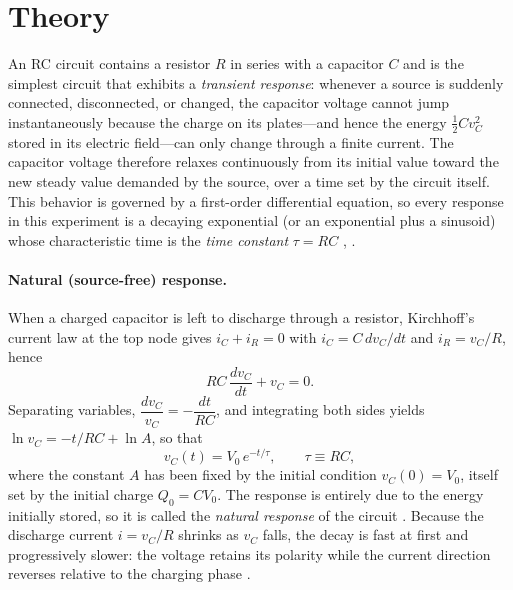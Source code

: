 \documentclass[12pt,a4paper]{article}
\begin{document}
	\section{Theory}
	An RC circuit contains a resistor $R$ in series with a capacitor $C$
	and is the simplest circuit that exhibits a \emph{transient response}:
	whenever a source is suddenly connected, disconnected, or changed, the
	capacitor voltage cannot jump instantaneously because the charge on
	its plates---and hence the energy $\tfrac{1}{2}Cv_C^2$ stored in its
	electric field---can only change through a finite current.  The
	capacitor voltage therefore relaxes continuously from its initial
	value toward the new steady value demanded by the source, over a time
	set by the circuit itself.  This behavior is governed by a first-order
	differential equation, so every response in this experiment is a
	decaying exponential (or an exponential plus a sinusoid) whose
	characteristic time is the \emph{time constant} $\tau = RC$
	\cite{sadiku}, \cite{boylestad}.
	
	\paragraph{Natural (source-free) response.}
	When a charged capacitor is left to discharge through a resistor,
	Kirchhoff's current law at the top node gives $i_C + i_R = 0$ with
	$i_C = C\,dv_C/dt$ and $i_R = v_C/R$, hence
	\begin{equation}
		RC\,\frac{dv_C}{dt} + v_C = 0 .
		\label{eq:natural-ode}
	\end{equation}
	Separating variables, $\dfrac{dv_C}{v_C} = -\dfrac{dt}{RC}$, and
	integrating both sides yields
	$\ln v_C = -t/RC + \ln A$, so that
	\begin{equation}
		v_C(t) = V_0\, e^{-t/\tau}, \qquad \tau \equiv RC,
		\label{eq:natural}
	\end{equation}
	where the constant $A$ has been fixed by the initial condition
	$v_C(0) = V_0$, itself set by the initial charge $Q_0 = C V_0$.  The
	response is entirely due to the energy initially stored, so it is
	called the \emph{natural response} of the circuit \cite{sadiku}.
	Because the discharge current $i = v_C/R$ shrinks as $v_C$ falls, the
	decay is fast at first and progressively slower: the voltage retains
	its polarity while the current direction reverses relative to the
	charging phase \cite{boylestad}.
	
\end{document}

